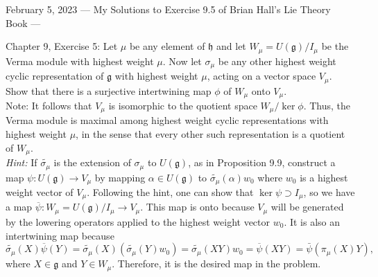 February 5, 2023
---
My Solutions to Exercise 9.5 of Brian Hall's Lie Theory Book
---

Chapter 9, Exercise 5: Let $\mu$ be any element of $\mathfrak{h}$ and let $W_\mu = U(\mathfrak{g})/I_\mu$ be the Verma module with
highest weight $\mu$. Now let $\sigma_\mu$ be any other highest weight cyclic representation of $\mathfrak{g}$ with highest weight $\mu$, acting on a vector space $V_\mu$. Show that there is a surjective intertwining map $\phi$ of $W_\mu$ onto $V_\mu$.\\
Note: It follows that $V_\mu$ is isomorphic to the quotient space $W_\mu/\ker \phi$. Thus, the Verma module is maximal among highest weight cyclic representations with highest weight $\mu$, in the sense that every other such representation is a quotient of $W_\mu.$\\
\emph{Hint: } If $\tilde{\sigma_\mu}$ is the extension of $\sigma_\mu$ to $U(\mathfrak{g})$, as in Proposition 9.9, construct a map $\psi: U(\mathfrak{g}) \to V_\mu$ by mapping $\alpha \in U(\mathfrak{g})$ to $\tilde{\sigma_\mu}(\alpha)w_0$ where $w_0$ is a highest weight vector of $V_\mu$.
Following the hint, one can show that $\ker \psi \supset I_\mu$, so we have a map $\overline{\psi}:W_\mu = U(\mathfrak{g})/I_\mu \to V_\mu.$ This map is onto because $V_\mu$ will be generated by the lowering operators applied to the highest weight vector $w_0$. It is also an intertwining map because $$\tilde{\sigma_\mu}(X)\overline{\psi}(Y) = \tilde{\sigma_\mu}(X)(\tilde{\sigma_\mu}(Y)w_0) = \tilde{\sigma_\mu}(XY)w_0 = \overline{\psi}(XY) = \bar{\psi}(\pi_\mu(X)Y),$$
where $X\in \mathfrak{g}$ and $Y\in W_\mu$. Therefore, it is the desired map in the problem.